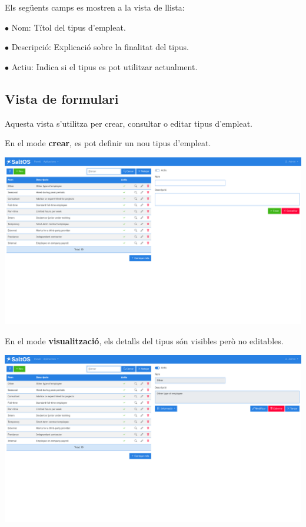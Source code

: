 \documentclass[a4paper]{article}
\begin{document}
Els següents camps es mostren a la vista de llista:

\begin{compactitem}
\item[\color{myblue}$\bullet$] Nom: Títol del tipus d'empleat.
\item[\color{myblue}$\bullet$] Descripció: Explicació sobre la finalitat del tipus.
\item[\color{myblue}$\bullet$] Actiu: Indica si el tipus es pot utilitzar actualment.
\end{compactitem}

\hypertarget{toc114}{}
\subsection{Vista de formulari}

Aquesta vista s'utilitza per crear, consultar o editar tipus d'empleat.

En el mode \textbf{crear}, es pot definir un nou tipus d'empleat.

\begin{center}\includegraphics[width=1\textwidth]{../ujest/snaps/test-screenshots-js-screenshots-hr-employees-types-create-ca-es-1-snap.png}\end{center}

En el mode \textbf{visualització}, els detalls del tipus són visibles però no editables.

\begin{center}\includegraphics[width=1\textwidth]{../ujest/snaps/test-screenshots-js-screenshots-hr-employees-types-view-10-ca-es-1-snap.png}\end{center}
\end{document}
